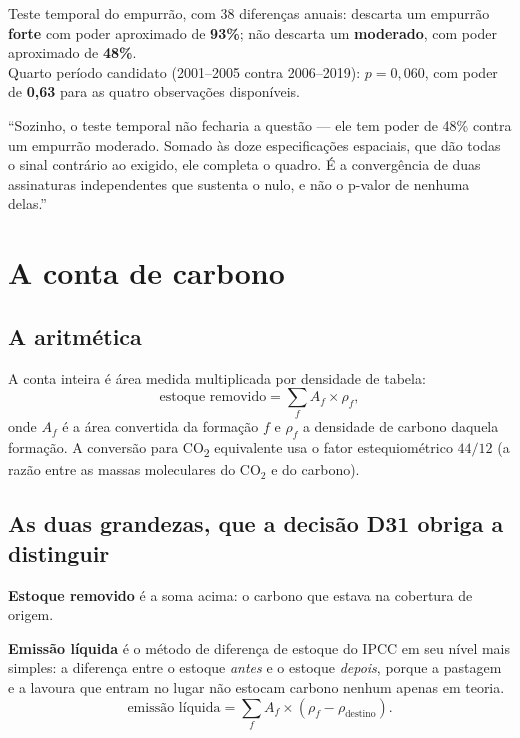 \begin{ancora}
Teste temporal do empurrão, com 38 diferenças anuais: descarta um empurrão
\textbf{forte} com poder aproximado de \textbf{93\%}; não descarta um
\textbf{moderado}, com poder aproximado de \textbf{48\%}. \\[4pt]
Quarto período candidato (2001--2005 contra 2006--2019): $p = 0{,}060$, com
poder de \textbf{0,63} para as quatro observações disponíveis.
\end{ancora}

\begin{nabanca}
``Sozinho, o teste temporal não fecharia a questão --- ele tem poder de 48\%
contra um empurrão moderado. Somado às doze especificações espaciais, que dão
todas o sinal contrário ao exigido, ele completa o quadro. É a convergência de
duas assinaturas independentes que sustenta o nulo, e não o p-valor de nenhuma
delas.''
\end{nabanca}

\chapter{A conta de carbono}
\label{cap:carbono}

\section{A aritmética}

A conta inteira é área medida multiplicada por densidade de tabela:
\begin{equation}
\text{estoque removido} = \sum_{f} A_f \times \rho_f ,
\end{equation}
onde $A_f$ é a área convertida da formação $f$ e $\rho_f$ a densidade de carbono
daquela formação. A conversão para CO\textsubscript{2} equivalente usa o fator
estequiométrico $44/12$ (a razão entre as massas moleculares do CO$_2$ e do
carbono).

\section{As duas grandezas, que a decisão D31 obriga a distinguir}

\textbf{Estoque removido} é a soma acima: o carbono que estava na cobertura de
origem.

\textbf{Emissão líquida} é o método de diferença de estoque do IPCC em seu nível
mais simples: a diferença entre o estoque \emph{antes} e o estoque
\emph{depois}, porque a pastagem e a lavoura que entram no lugar não estocam
carbono nenhum apenas em teoria.
\begin{equation}
\text{emissão líquida} = \sum_f A_f \times (\rho_f - \rho_{\text{destino}}).
\end{equation}

